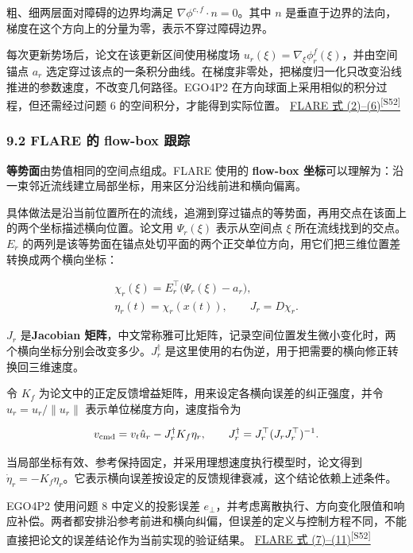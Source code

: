 \documentclass[11pt,a4paper]{article}
\numberwithin{equation}{topic}
\newcommand{\sourceref}[2]{\hyperlink{source-#1}{#2\textsuperscript{[#1]}}}
\begin{document}
粗、细两层面对障碍的边界均满足 \(\nabla\phi^{c,f}\cdot n=0\)。其中 \(n\) 是垂直于边界的法向，梯度在这个方向上的分量为零，表示不穿过障碍边界。

每次更新势场后，论文在该更新区间使用梯度场 \(u_r(\xi)=\nabla_\xi\phi_r^f(\xi)\)，并由空间锚点 \(a_r\) 选定穿过该点的一条积分曲线。在梯度非零处，把梯度归一化只改变沿线推进的参数速度，不改变几何路径。EGO4P2 在方向球面上采用相似的积分过程，但还需经过问题 6 的空间积分，才能得到实际位置。 \sourceref{S52}{FLARE 式 (2)–(6)}

\subsubsection*{9.2 FLARE 的 flow-box 跟踪}

\textbf{等势面}由势值相同的空间点组成。FLARE 使用的 \textbf{flow-box 坐标}可以理解为：沿一束邻近流线建立局部坐标，用来区分沿线前进和横向偏离。

具体做法是沿当前位置所在的流线，追溯到穿过锚点的等势面，再用交点在该面上的两个坐标描述横向位置。论文用 \(\Psi_r(\xi)\) 表示从空间点 \(\xi\) 所在流线找到的交点。\(E_r\) 的两列是该等势面在锚点处切平面的两个正交单位方向，用它们把三维位置差转换成两个横向坐标：

\begin{equation}
\label{eq:flow-box}
\begin{gathered}
\chi_r(\xi)=E_r^\top\bigl(\Psi_r(\xi)-a_r\bigr),\qquad\\
\eta_r(t)=\chi_r(x(t)),\qquad J_r=D\chi_r.
\end{gathered}
\end{equation}

\(J_r\) 是\textbf{Jacobian 矩阵}，中文常称雅可比矩阵，记录空间位置发生微小变化时，两个横向坐标分别会改变多少。\(J_r^\dagger\) 是这里使用的右伪逆，用于把需要的横向修正转换回三维速度。

令 \(K_f\) 为论文中的正定反馈增益矩阵，用来设定各横向误差的纠正强度，并令 \(\hat u_r=u_r/\|u_r\|\) 表示单位梯度方向，速度指令为

\begin{equation}
\label{eq:flare-feedback}
v_{\rm cmd}=v_t\hat u_r-J_r^\dagger K_f\eta_r,\qquad
J_r^\dagger=J_r^\top(J_rJ_r^\top)^{-1}.
\end{equation}

当局部坐标有效、参考保持固定，并采用理想速度执行模型时，论文得到 \(\dot\eta_r=-K_f\eta_r\)。它表示横向误差按设定的反馈规律衰减，这个结论依赖上述条件。

EGO4P2 使用问题 8 中定义的投影误差 \(e_\perp\)，并考虑离散执行、方向变化限值和响应补偿。两者都安排沿参考前进和横向纠偏，但误差的定义与控制方程不同，不能直接把论文的误差结论作为当前实现的验证结果。 \sourceref{S52}{FLARE 式 (7)–(11)}
\end{document}
